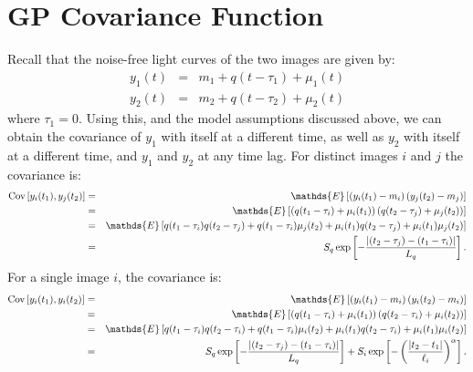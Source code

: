 \documentclass[useAMS,usenatbib, a4paper]{mn2e} \usepackage{natbib}
\begin{document}
\appendix
\onecolumn

\section{GP Covariance Function}
Recall that the noise-free light curves of the two images are given by:
\begin{eqnarray}
y_1(t) &=& m_1 + q(t - \tau_1) + \mu_1(t) \\
y_2(t) &=& m_2 + q(t - \tau_2) + \mu_2(t)
\end{eqnarray}
where $\tau_1 = 0$.
Using this, and the model assumptions discussed above, we can obtain the
covariance of $y_1$ with itself at a different time, as well as $y_2$ with itself
at a different time, and $y_1$ and $y_2$ at any time lag. For distinct images
$i$ and $j$ the covariance is:
\begin{eqnarray}
\textnormal{Cov}\left[y_i(t_1), y_j(t_2)\right]
&=& \mathds{E}\left[\left(y_i(t_1) - m_i\right)\left(y_j(t_2) - m_j\right)\right]\\
&=& \mathds{E}\left[\left(q(t_1 - \tau_i) + \mu_i(t_1)\right)
\left(q(t_2 - \tau_j) + \mu_j(t_2)\right)\right]\\
&=& \mathds{E}\left[q(t_1 - \tau_i)q(t_2 - \tau_j) + q(t_1 - \tau_i)\mu_j(t_2)
+ \mu_i(t_1)q(t_2 - \tau_j) + \mu_i(t_1)\mu_j(t_2)
\right]\\
&=& S_q\exp
\left[-\frac{|(t_2 -\tau_j)- (t_1-\tau_i)|}{L_q}\right].
\end{eqnarray}
For a single image $i$, the covariance is:
\begin{eqnarray}
\textnormal{Cov}\left[y_i(t_1), y_i(t_2)\right]
&=& \mathds{E}\left[\left(y_i(t_1) - m_i\right)\left(y_i(t_2) - m_i\right)\right]\\
&=& \mathds{E}\left[\left(q(t_1 - \tau_i) + \mu_i(t_1)\right)
\left(q(t_2 - \tau_i) + \mu_i(t_2)\right)\right]\\
&=& \mathds{E}\left[q(t_1 - \tau_i)q(t_2 - \tau_i) + q(t_1 - \tau_i)\mu_i(t_2)
+ \mu_i(t_1)q(t_2 - \tau_i) + \mu_i(t_1)\mu_i(t_2)
\right]\\
&=& S_q\exp
\left[-\frac{|(t_2 -\tau_j)- (t_1-\tau_i)|}{L_q}\right] +
S_i\exp\left[
-\left(\frac{|t_2 - t_1|
}{\ell_i}\right)^\alpha
\right]
.
\end{eqnarray}
\end{document}
